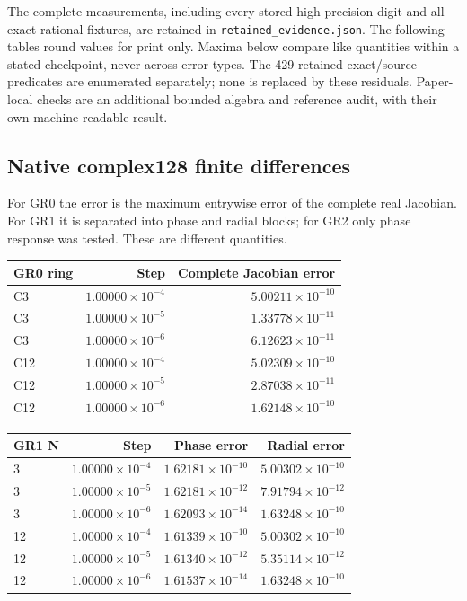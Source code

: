 The complete measurements, including every stored high-precision digit and
all exact rational fixtures, are retained in \texttt{retained\_evidence.json}.
The following tables round values for print only. Maxima below compare like
quantities within a stated checkpoint, never across error types. The 429
retained exact/source predicates are enumerated separately; none is replaced
by these residuals. Paper-local checks are an additional bounded algebra and
reference audit, with their own machine-readable result.

\subsection*{Native complex128 finite differences}
For GR0 the error is the maximum entrywise error of the complete real
Jacobian. For GR1 it is separated into phase and radial blocks; for GR2 only
phase response was tested. These are different quantities.

\begin{center}\begin{tabular}{@{}lrr@{}}
\toprule
GR0 ring & Step & Complete Jacobian error\\\midrule
C3 & \(1.00000\times10^{-4}\) & \(5.00211\times10^{-10}\)\\
C3 & \(1.00000\times10^{-5}\) & \(1.33778\times10^{-11}\)\\
C3 & \(1.00000\times10^{-6}\) & \(6.12623\times10^{-11}\)\\
C12 & \(1.00000\times10^{-4}\) & \(5.02309\times10^{-10}\)\\
C12 & \(1.00000\times10^{-5}\) & \(2.87038\times10^{-11}\)\\
C12 & \(1.00000\times10^{-6}\) & \(1.62148\times10^{-10}\)\\
\bottomrule\end{tabular}\end{center}

\begin{center}\begin{tabular}{@{}lrrr@{}}
\toprule
GR1 N & Step & Phase error & Radial error\\\midrule
3 & \(1.00000\times10^{-4}\) & \(1.62181\times10^{-10}\) & \(5.00302\times10^{-10}\)\\
3 & \(1.00000\times10^{-5}\) & \(1.62181\times10^{-12}\) & \(7.91794\times10^{-12}\)\\
3 & \(1.00000\times10^{-6}\) & \(1.62093\times10^{-14}\) & \(1.63248\times10^{-10}\)\\
12 & \(1.00000\times10^{-4}\) & \(1.61339\times10^{-10}\) & \(5.00302\times10^{-10}\)\\
12 & \(1.00000\times10^{-5}\) & \(1.61340\times10^{-12}\) & \(5.35114\times10^{-12}\)\\
12 & \(1.00000\times10^{-6}\) & \(1.61537\times10^{-14}\) & \(1.63248\times10^{-10}\)\\
\bottomrule\end{tabular}\end{center}

